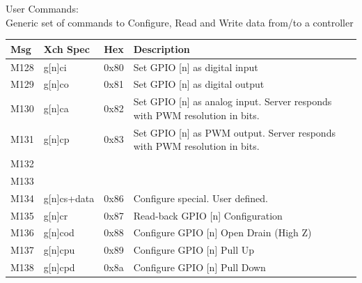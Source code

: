 \documentclass[12pt]{article}
\begin{document}
	\vspace{2em}
	User Commands:\\

	Generic set of commands to Configure, Read and Write data from/to a controller\\

\begin{tabular}{ | m{2.5em} | m{7em}| m{2.5em} | m{17em} | } 
	\hline
	Msg & Xch Spec & Hex & Description \\ 
	\hline
	M128 & g[n]ci & 0x80 & Set GPIO [n] as digital input \\
	\hline
	M129 & g[n]co & 0x81 & Set GPIO [n] as digital output \\
	\hline
	M130 & g[n]ca & 0x82 & Set GPIO [n] as analog input. Server responds with PWM resolution in bits. \\
	\hline
	M131 & g[n]cp & 0x83 & Set GPIO [n] as PWM output. Server responds with PWM resolution in bits. \\
	\hline
	M132 & & & \\
	\hline
	M133 & & & \\
	\hline
	M134 & g[n]cs+data & 0x86 & Configure special. User defined. \\
	\hline
	M135 & g[n]cr & 0x87 & Read-back GPIO [n] Configuration \\
	\hline
	M136 & g[n]cod & 0x88 & Configure GPIO [n] Open Drain (High Z) \\
	\hline
	M137 & g[n]cpu & 0x89 & Configure GPIO [n] Pull Up \\
	\hline
	M138 & g[n]cpd & 0x8a & Configure GPIO [n] Pull Down \\
	\hline
\end{tabular}
\end{document}
